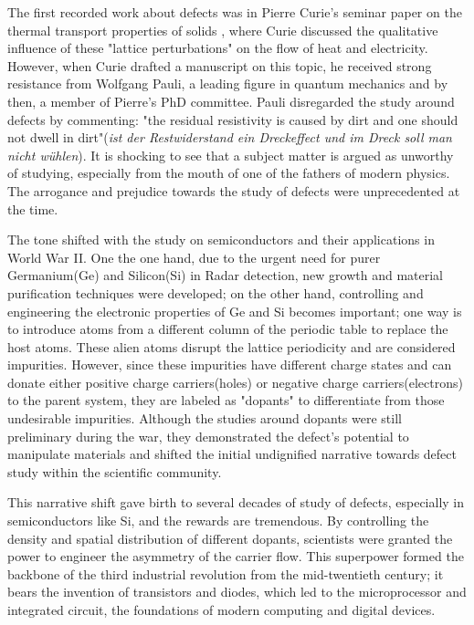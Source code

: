 The first recorded work about defects was in Pierre Curie's seminar paper on the thermal transport properties of solids \cite{ZurKinetischenTheorie}, where Curie discussed the qualitative influence of these "lattice perturbations" on the flow of heat and electricity. However, when Curie drafted a manuscript on this topic, he received strong resistance from Wolfgang Pauli, a leading figure in quantum mechanics and by then, a member of Pierre's PhD committee. Pauli disregarded the study around defects by commenting: "the residual resistivity is caused by dirt and one should not dwell in dirt"(\textit{ist der Restwiderstand ein Dreckeffect und im Dreck soll man nicht wühlen}). It is shocking to see that a subject matter is argued as unworthy of studying, especially from the mouth of one of the fathers of modern physics. The arrogance and prejudice towards the study of defects were unprecedented at the time.

The tone shifted with the study on semiconductors and their applications in World War II. One the one hand, due to the urgent need for purer Germanium(Ge) and Silicon(Si) in Radar detection, new growth and material purification techniques were developed; on the other hand, controlling and engineering the electronic properties of Ge and Si becomes important; one way is to introduce atoms from a different column of the periodic table to replace the host atoms. These alien atoms disrupt the lattice periodicity and are considered impurities. However, since these impurities have different charge states and can donate either positive charge carriers(holes) or negative charge carriers(electrons) to the parent system, they are labeled as "dopants" to differentiate from those undesirable impurities. Although the studies around dopants were still preliminary during the war, they demonstrated the defect's potential to manipulate materials and shifted the initial undignified narrative towards defect study within the scientific community.

This narrative shift gave birth to several decades of study of defects, especially in semiconductors like Si, and the rewards are tremendous. By controlling the density and spatial distribution of different dopants, scientists were granted the power to engineer the asymmetry of the carrier flow. This superpower formed the backbone of the third industrial revolution from the mid-twentieth century; it bears the invention of transistors and diodes, which led to the microprocessor and integrated circuit, the foundations of modern computing and digital devices.   


